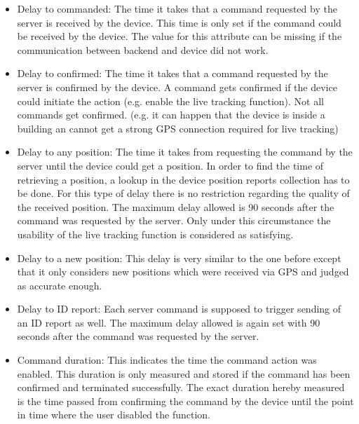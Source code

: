 \begin{itemize}
	\begin{itemize}
		\item Delay to commanded: The time it takes that a command requested by the server is received by the device. This time is only set if the command could be received by the device. The value for this attribute can be missing if the communication between backend and device did not work.
		\item Delay to confirmed: The time it takes that a command requested by the server is confirmed by the device. A command gets confirmed if the device could initiate the action (e.g. enable the live tracking function). Not all commands get confirmed. (e.g. it can happen that the device is inside a building an cannot get a strong GPS connection required for live tracking)
		\item Delay to any position: The time it takes from requesting the command by the server until the device could get a position. In order to find the time of retrieving a position, a lookup in the device position reports collection has to be done. For this type of delay there is no restriction regarding the quality of the received position. The maximum delay allowed is 90 seconds after the command was requested by the server. Only under this circumstance the usability of the live tracking function is considered as satisfying. 
		\item Delay to a new position: This delay is very similar to the one before except that it only considers new positions which were received via GPS and judged as accurate enough. 
		\item Delay to ID report: Each server command is supposed to trigger sending of an ID report as well. The maximum delay allowed is again set with 90 seconds after the command was requested by the server. 
		\item Command duration: This indicates the time the command action was enabled. This duration is only measured and stored if the command has been confirmed and terminated successfully. The exact duration hereby measured is the time passed from confirming the command by the device until the point in time where the user disabled the function. 
	\end{itemize}


\end{itemize}
